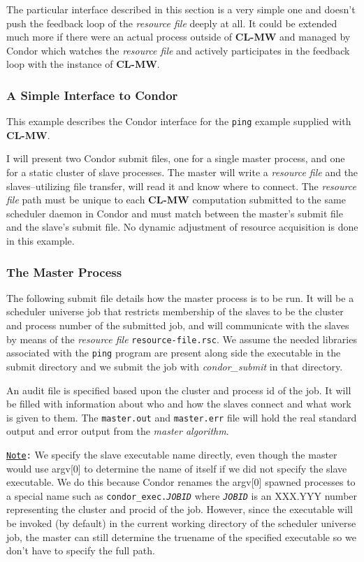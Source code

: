 \documentclass[titlepage,12pt]{book}
\newcommand{\xsmall}{\latexhtml{\small}{}}
\newcommand{\xnormalsize}{\latexhtml{\normalsize}{}}
\newcommand{\clmw}{\xsmall\textbf{CL-MW}\xnormalsize\xspace}
\newcommand{\ma}{\textit{master algorithm}\xspace}
\newcommand{\rfile}{\textit{resource file}\xspace}
\newcommand{\file}[1]{\texttt{#1}\xspace}
\newcommand{\Note}{\texttt{\underline{Note}:}\xspace}
\begin{document}
The particular interface described in this section is a very simple one
and doesn't push the feedback loop of the \rfile deeply at all. It
could be extended much more if there were an actual process outside
of \clmw and managed by Condor which watches the \rfile and actively
participates in the feedback loop with the instance of \clmw.

\subsubsection{A Simple Interface to Condor}

This example describes the Condor interface for the \texttt{ping}
example supplied with \clmw.

I will present two Condor submit files, one for a single master
process, and one for a static cluster of slave processes. The master
will write a \rfile and the slaves--utilizing file transfer, will
read it and know where to connect. The \rfile path must be unique
to each \clmw computation submitted to the same scheduler daemon
in Condor and must match between the master's submit file and the
slave's submit file. No dynamic adjustment of resource acquisition is
done in this example.

\subsubsection{The Master Process}

The following submit file details how the master process is to be run.
It will be a scheduler universe job that restricts membership of
the slaves to be the cluster and process number of the submitted
job, and will communicate with the slaves by means of the \rfile
\file{resource-file.rsc}. We assume the needed libraries associated
with the \texttt{ping} program are present along side the executable in
the submit directory and we submit the job with \textit{condor\_submit}
in that directory.

An audit file is specified based upon the cluster and process id of
the job.  It will be filled with information about who and how the
slaves connect and what work is given to them. The \file{master.out}
and \file{master.err} file will hold the real standard output and
error output from the \ma.

\Note We specify the slave executable name directly, even though
the master would use argv[0] to determine the name of itself if we
did not specify the slave executable. We do this because Condor
renames the argv[0] spawned processes to a special name such as
\texttt{condor\_exec.\textit{JOBID}} where \texttt{\textit{JOBID}}
is an XXX.YYY number representing the cluster and procid of the job.
However, since the executable will be invoked (by default) in the
current working directory of the scheduler universe job, the master
can still determine the truename of the specified executable so we
don't have to specify the full path.
\end{document}
